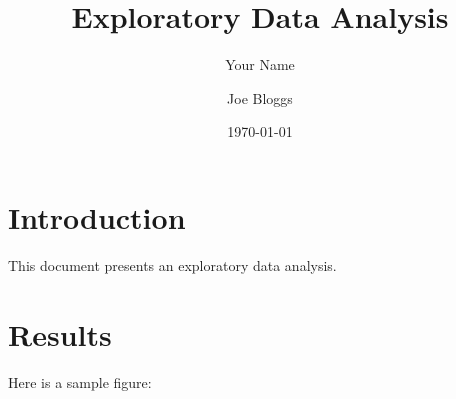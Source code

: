 \documentclass{article}
\title{Exploratory Data Analysis}
\author{Your Name}
\date{\today}
\begin{document}
\author{Joe Bloggs}

\maketitle{}

\section{Introduction}
This document presents an exploratory data analysis.

\section{Results}
Here is a sample figure:

\begin{figure}[h]
\end{figure}
\end{document}
